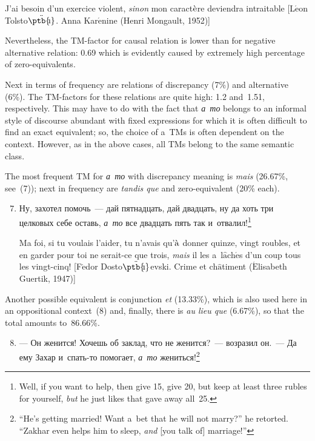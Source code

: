 \begin{multicols}{2}
\begin{enumerate}[(1)]
  J'ai besoin d'un exercice violent, \textit{sinon} mon caract$\Grave{\mbox{e}}$re deviendra 
intraitable [L$\acute{\mbox{e}}$on Tolsto{$\ddot{\mbox{\ptb{\!\i}}}$}. Anna 
Kar$\acute{\mbox{e}}$nine (Henri Mongault, 1952)]
  \end{enumerate}

  Nevertheless, the TM-factor for causal relation is lower than for negative 
alternative relation: 0.69 which is evidently caused by extremely high percentage of 
zero-equivalents.
  
  Next in terms of frequency are relations of discrepancy (7\%) and alternative 
(6\%). The TM-factors for these relations are quite high: 1.2 and~1.51, respectively. 
This may have to do with the fact that \textit{а~то} belongs to an informal style of 
discourse abundant with fixed expressions for which it is often difficult to find an 
exact equivalent; so, the choice of a~TMs is often dependent on the 
context. However, as in the above cases, all TMs belong to the same 
semantic class.
  
  The most frequent TM for \textit{а~то} with discrepancy meaning is 
\textit{mais} (26.67\%, see~(7)); next in frequency are \textit{tandis que} and  
zero-equivalent (20\% each).
  \begin{enumerate}[(1)]
  \setcounter{enumi}{6}
\item Ну, захотел помочь~--- дай пятнадцать, дай двадцать, ну да хоть три 
целковых себе оставь, \textit{а~то} все двадцать пять так 
и~отвалил!\footnote[4]{Well, if you want to help, then give 15, give 20, but keep at least three rubles 
for yourself, \textit{but} he just likes that gave away all~25.} 

 
Ma foi, si tu voulais l'aider, tu n'avais qu'$\Grave{\mbox{a}}$ donner quinze, 
vingt roubles, et en garder pour toi ne serait-ce que trois, \textit{mais} il les 
a~l$\hat{\mbox{a}}$ch$\acute{\mbox{e}}$s d'un coup tous les vingt-cinq! 
[F$\acute{\mbox{e}}$dor Dosto{$\ddot{\mbox{\ptb{\!\i}}}$}evski. Crime et 
ch$\hat{\mbox{a}}$timent ($\acute{\mbox{E}}$lisabeth Guertik, 1947)]
\end{enumerate}

  Another possible equivalent is conjunction \textit{et} (13.33\%), which is also used 
here in an oppositional context~(8) and, finally, there is \textit{au lieu que} (6.67\%), 
so that the total amounts to~86.66\%.
  \begin{enumerate}[(1)]
  \setcounter{enumi}{7}
\item --- Он женится! Хочешь об заклад, что не женится?~--- возразил он.~--- 
Да ему Захар и~спать-то помогает, \textit{а~то} жениться!\footnote{``He's 
getting married! Want a~bet that he will not marry?'' he retorted. ``Zakhar even helps him to sleep, 
\textit{and} [you talk of] marriage!''}


\end{enumerate}
\end{multicols}
